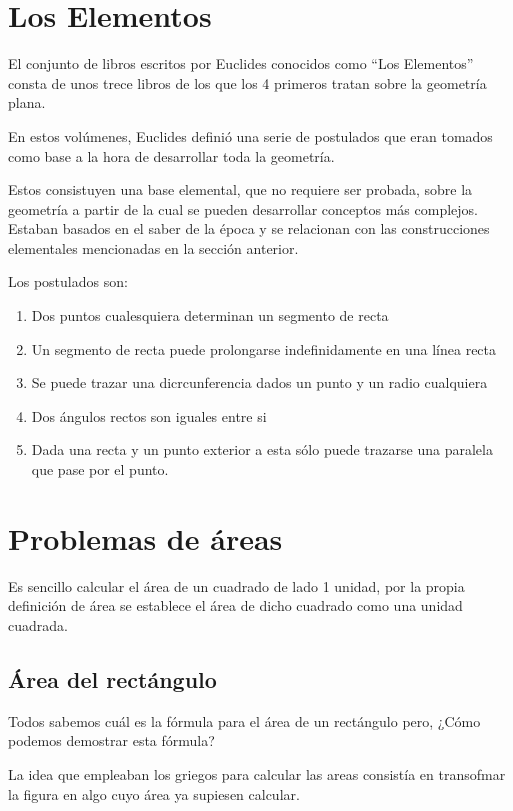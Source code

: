 \documentclass{apuntes}
\begin{document}
\section{Los Elementos}
El conjunto de libros escritos por Euclides conocidos como ``Los Elementos'' consta de unos trece libros de los que los 4 primeros tratan sobre la geometría plana.

En estos volúmenes, Euclides definió  una serie de postulados que eran tomados como base a la hora de desarrollar toda la geometría.

Estos  consistuyen una base elemental, que no requiere ser probada, sobre la geometría a partir de la cual se pueden desarrollar conceptos más complejos. Estaban basados en el saber de la época y se relacionan con las construcciones elementales mencionadas en la sección anterior.

Los postulados son:
\begin{enumerate}
\item Dos puntos cualesquiera determinan un segmento de recta
\item Un segmento de recta puede prolongarse indefinidamente en una línea recta
\item Se puede trazar una dicrcunferencia dados un punto y un radio cualquiera
\item Dos ángulos rectos son iguales entre si
\item Dada una recta y un punto exterior a esta sólo puede trazarse una paralela que pase por el punto.
\end{enumerate}

\section{Problemas de áreas}
Es sencillo calcular el área de un cuadrado de lado 1 unidad, por la propia definición de área se establece el área de dicho cuadrado como una unidad cuadrada.

\subsection{Área del rectángulo}

Todos sabemos cuál es la fórmula para el área de un rectángulo pero, ¿Cómo podemos demostrar esta fórmula?

La idea que empleaban los griegos para calcular las areas consistía en transofmar la figura en algo cuyo área ya supiesen calcular.
\end{document}

